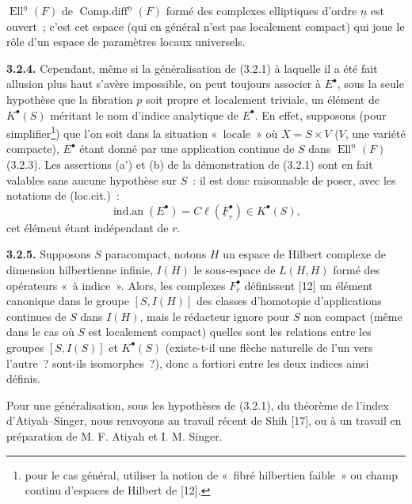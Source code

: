 $\operatorname{Ell}^{\underline n}(F)$ de
$\operatorname{Comp.diff}^{\underline n}(F)$ formé des complexes elliptiques d'ordre $\underline n$ est ouvert~; c'est cet espace (qui en général n'est pas localement compact) qui joue le rôle d'un espace de paramètres locaux universels.

\textbf{3.2.4.} Cependant, même si la généralisation de (3.2.1) à laquelle il a été fait allusion plus haut s'avère impossible, on peut toujours associer à $E^\bullet$, sous la seule hypothèse que la fibration $p$ soit propre et localement triviale, un élément de $K^\bullet(S)$ méritant le nom d'indice analytique de $E^\bullet$. En effet, supposons (pour simplifier\footnote{pour le cas général, utiliser la notion de «~fibré hilbertien faible~» ou champ continu d'espaces de Hilbert de [12].}) que l'on soit dans la situation «~locale~» où $X=S\times V$ ($V$, une variété compacte), $E^\bullet$ étant donné par une application continue de $S$ dans $\operatorname{Ell}^{\underline n}(F)$ (3.2.3). Les assertions (a') et (b) de la démonstration de (3.2.1) sont en fait valables sans aucune hypothèse sur $S$~: il est donc raisonnable de poser, avec les notations de (loc.cit.)~:
\[
  \operatorname{ind.an}(E^\bullet)=C\ell(\underline F_r^\bullet)\in K^\bullet(S),
\]
cet élément étant indépendant de $r$.

\textbf{3.2.5.} Supposons $S$ paracompact, notons $H$ un espace de Hilbert complexe de dimension hilbertienne infinie, $I(H)$ le sous-espace de $L(H,H)$ formé des opérateurs «~à indice~». Alors, les complexes $F_r^\bullet$ définissent [12] un élément canonique dans le groupe $[S,I(H)]$ des classes d'homotopie d'applications continues de $S$ dans $I(H)$, mais le rédacteur ignore pour $S$ non compact (même dans le cas où $S$ est localement compact) quelles sont les relations entre les groupes $[S,I(S)]$ et $K^\bullet(S)$ (existe-t-il une flèche naturelle de l'un vers l'autre~? sont-ils isomorphes~?), donc a fortiori entre les deux indices ainsi définis.

Pour une généralisation, sous les hypothèses de (3.2.1), du théorème de l'index d'Atiyah--Singer, nous renvoyons au travail récent de Shih [17], ou à un travail en préparation de M. F. Atiyah et I. M. Singer.

